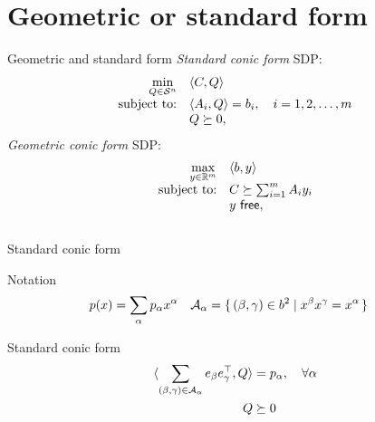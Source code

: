 \documentclass{beamer}
\begin{document}
\section{Geometric or standard form}

\begin{frame}{Geometric and standard form}
    \emph{Standard conic form} SDP:
    \begin{equation*}
          \begin{array}{rl}
              \min\limits_{Q \in \SymK[n]} & \la C, Q \ra\\
              \text{subject to:} & \la A_i, Q \ra = b_i, \quad i=1,2,\ldots,m\\
                                 & Q \succeq 0,
          \end{array}
      \end{equation*}
      \emph{Geometric conic form} SDP:
      \begin{equation*}
          \begin{array}{rl}
              \max\limits_{y \in \mathbb{R}^m} & \la b, y \ra\\
              \text{subject to:} & C \succeq \sum_{i=1}^m A_i y_i\\
                                 & y\ \mathsf{free},
          \end{array}
      \end{equation*}
    \begin{align*}
    \end{align*}
\end{frame}

\begin{frame}{Standard conic form}
    \begin{block}{Notation}
        \begin{align*}
            p(x) & = \sum_{\alpha} p_\alpha x^\alpha &
            \mathcal{A}_\alpha &= \setbuild{(\beta, \gamma) \in b^2}{x^\beta x^\gamma = x^\alpha}
        \end{align*}
    \end{block}
    \begin{block}{Standard conic form}
        \begin{align*}
            \la \sum_{(\beta, \gamma) \in \mathcal{A}_\alpha} e_\beta e_\gamma^\Tr, Q \ra & = p_\alpha, \quad\forall \alpha\\
            Q & \succeq 0
        \end{align*}
    \end{block}
\end{frame}
\end{document}
